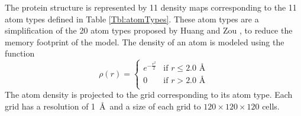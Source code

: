 The protein structure is represented by 11 density maps corresponding
to the 11 atom types defined in Table \ref{Tbl:atomTypes}.
%
These atom types are a simplification of the 20 atom types proposed by
Huang and Zou \cite{huang2006iterative, huang2008iterative}, to reduce
the memory footprint of the model.
%
%
The density of an atom is modeled using the function
$$
\rho(r) =  \begin{cases}
               e^{-\frac{r^2}{2}}&\text{if } r\leq 2.0\text{ \AA} \\
               0                 &\text{if } r>2.0\text{ \AA} \\
            \end{cases}
\label{eq:rho}
$$
The atom density is projected to the grid corresponding to its atom
type. Each grid has a resolution of 1~\AA\ and a size of each grid to
$120\times 120\times 120$ cells.


